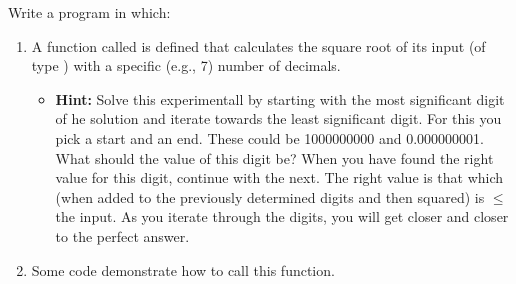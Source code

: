 Write a program in which:
\begin{enumerate}
  \item A function called  is defined that calculates the square root of its input (of type ) with a specific (e.g., 7) number of decimals.
    \begin{itemize}
      \item \textbf{Hint:} Solve this experimentall by starting with the most significant digit of he solution and iterate towards the least significant digit. For this you pick a start and an end. These could be 1000000000 and 0.000000001. What should the value of this digit be? When you have found the right value for this digit, continue with the next. The right value is that which (when added to the previously determined digits and then squared) is $\leq$ the input. As you iterate through the digits, you will get closer and closer to the perfect answer.
    \end{itemize}
  \item Some code demonstrate how to call this function.
\end{enumerate}
